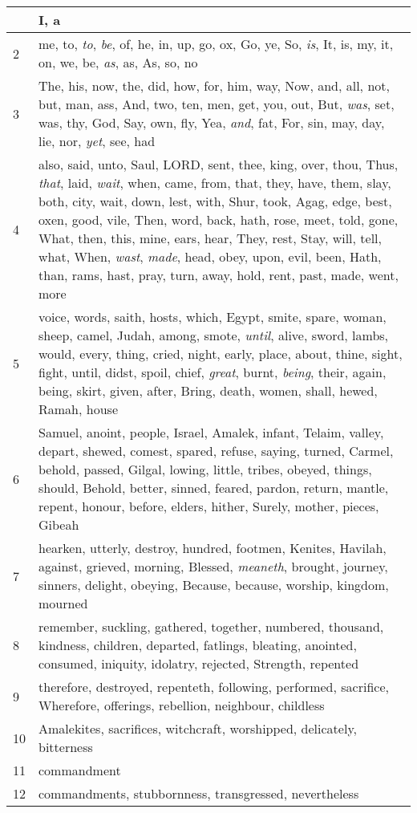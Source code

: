 \begin{longtable}{l|p{3.75in}}
\hline \hline
\endlastfoot
1 & I, a \\ \hline
2 & me, to, \emph{to}, \emph{be}, of, he, in, up, go, ox, Go, ye, So, \emph{is}, It, is, my, it, on, we, be, \emph{as}, as, As, so, no \\ \hline
3 & The, his, now, the, did, how, for, him, way, Now, and, all, not, but, man, ass, And, two, ten, men, get, you, out, But, \emph{was}, set, was, thy, God, Say, own, fly, Yea, \emph{and}, fat, For, sin, may, day, lie, nor, \emph{yet}, see, had \\ \hline
4 & also, said, unto, Saul, LORD, sent, thee, king, over, thou, Thus, \emph{that}, laid, \emph{wait}, when, came, from, that, they, have, them, slay, both, city, wait, down, lest, with, Shur, took, Agag, edge, best, oxen, good, vile, Then, word, back, hath, rose, meet, told, gone, What, then, this, mine, ears, hear, They, rest, Stay, will, tell, what, When, \emph{wast}, \emph{made}, head, obey, upon, evil, been, Hath, than, rams, hast, pray, turn, away, hold, rent, past, made, went, more \\ \hline
5 & voice, words, saith, hosts, which, Egypt, smite, spare, woman, sheep, camel, Judah, among, smote, \emph{until}, alive, sword, lambs, would, every, thing, cried, night, early, place, about, thine, sight, fight, until, didst, spoil, chief, \emph{great}, burnt, \emph{being}, their, again, being, skirt, given, after, Bring, death, women, shall, hewed, Ramah, house \\ \hline
6 & Samuel, anoint, people, Israel, Amalek, infant, Telaim, valley, depart, shewed, comest, spared, refuse, saying, turned, Carmel, behold, passed, Gilgal, lowing, little, tribes, obeyed, things, should, Behold, better, sinned, feared, pardon, return, mantle, repent, honour, before, elders, hither, Surely, mother, pieces, Gibeah \\ \hline
7 & hearken, utterly, destroy, hundred, footmen, Kenites, Havilah, against, grieved, morning, Blessed, \emph{meaneth}, brought, journey, sinners, delight, obeying, Because, because, worship, kingdom, mourned \\ \hline
8 & remember, suckling, gathered, together, numbered, thousand, kindness, children, departed, fatlings, bleating, anointed, consumed, iniquity, idolatry, rejected, Strength, repented \\ \hline
9 & therefore, destroyed, repenteth, following, performed, sacrifice, Wherefore, offerings, rebellion, neighbour, childless \\ \hline
10 & Amalekites, sacrifices, witchcraft, worshipped, delicately, bitterness \\ \hline
11 & commandment \\ \hline
12 & commandments, stubbornness, transgressed, nevertheless \\ \hline
\end{longtable}






